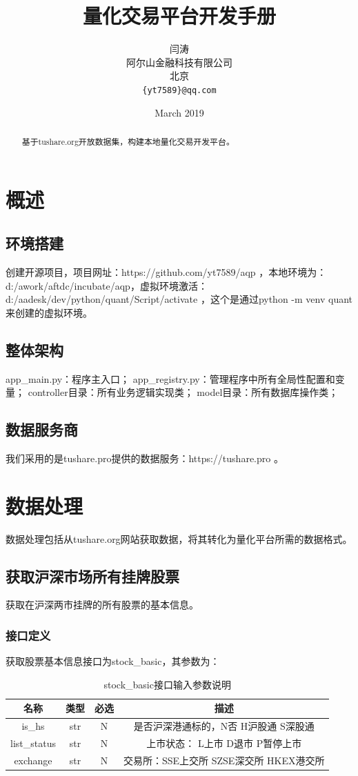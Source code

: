 \documentclass{article}
\title{量化交易平台开发手册}
\author{
  闫涛 \\
  阿尔山金融科技有限公司\\
  北京 \\
  \texttt{\{yt7589\}@qq.com} \\
}
\date{March 2019}
\begin{document}
\maketitle
\begin{abstract}
基于tushare.org开放数据集，构建本地量化交易开发平台。
\end{abstract}
\section{概述}
\subsection{环境搭建}
创建开源项目，项目网址：https://github.com/yt7589/aqp ，本地环境为：d:/awork/aftdc/incubate/aqp，虚拟环境激活：d:/aadesk/dev/python/quant/Script/activate ，这个是通过python -m venv quant来创建的虚拟环境。
\subsection{整体架构}
app\_main.py：程序主入口； \newline
app\_registry.py：管理程序中所有全局性配置和变量；\newline
controller目录：所有业务逻辑实现类；\newline
model目录：所有数据库操作类；\newline
\subsection{数据服务商}
我们采用的是tushare.pro提供的数据服务：https://tushare.pro 。
\section{数据处理}
数据处理包括从tushare.org网站获取数据，将其转化为量化平台所需的数据格式。
\subsection{获取沪深市场所有挂牌股票}
获取在沪深两市挂牌的所有股票的基本信息。
\subsubsection{接口定义}
获取股票基本信息接口为stock\_basic，其参数为：

\begin{table}[h]
\caption{stock\_basic接口输入参数说明}
\label{t000001}
\begin{tabular}{|c|c|c|c|} \hline
名称 & 类型 & 必选 & 描述 \\ \hline  
is\_hs & str & N & 是否沪深港通标的，N否 H沪股通 S深股通 \\ \hline
list\_status & str & N & 上市状态： L上市 D退市 P暂停上市 \\ \hline
exchange & str & N & 交易所：SSE上交所 SZSE深交所 HKEX港交所 \\ \hline
\end{tabular}
\end{table}
\end{document}
